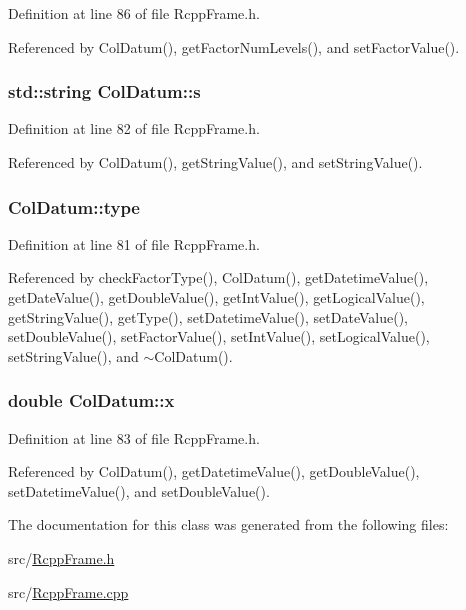 Definition at line 86 of file RcppFrame.h.

Referenced by ColDatum(), getFactorNumLevels(), and setFactorValue().\hypertarget{classColDatum_a5a1c85e1da2da02052078a3c8d810be9}{
\subsubsection[{s}]{\setlength{\rightskip}{0pt plus 5cm}std::string {\bf ColDatum::s}}}
\label{classColDatum_a5a1c85e1da2da02052078a3c8d810be9}


Definition at line 82 of file RcppFrame.h.

Referenced by ColDatum(), getStringValue(), and setStringValue().\hypertarget{classColDatum_ac539e7f62828f2683f1825a84a19d231}{
\subsubsection[{type}]{ {\bf ColDatum::type}}}
\label{classColDatum_ac539e7f62828f2683f1825a84a19d231}


Definition at line 81 of file RcppFrame.h.

Referenced by checkFactorType(), ColDatum(), getDatetimeValue(), getDateValue(), getDoubleValue(), getIntValue(), getLogicalValue(), getStringValue(), getType(), setDatetimeValue(), setDateValue(), setDoubleValue(), setFactorValue(), setIntValue(), setLogicalValue(), setStringValue(), and $\sim$ColDatum().\hypertarget{classColDatum_a6d3d286cbd6c4ad24f1f12266662e42e}{
\subsubsection[{x}]{\setlength{\rightskip}{0pt plus 5cm}double {\bf ColDatum::x}}}
\label{classColDatum_a6d3d286cbd6c4ad24f1f12266662e42e}


Definition at line 83 of file RcppFrame.h.

Referenced by ColDatum(), getDatetimeValue(), getDoubleValue(), setDatetimeValue(), and setDoubleValue().

The documentation for this class was generated from the following files:\begin{DoxyCompactItemize}
\item 
src/\hyperlink{RcppFrame_8h}{RcppFrame.h}\item 
src/\hyperlink{RcppFrame_8cpp}{RcppFrame.cpp}\end{DoxyCompactItemize}
